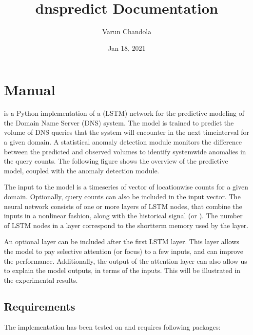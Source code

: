 \documentclass[letterpaper,10pt,english]{sphinxmanual}
\title{dnspredict Documentation}
\date{Jan 18, 2021}
\author{Varun Chandola}
\let\sphinxpxdimen\pdfpxdimen\else\newdimen\sphinxpxdimen
\begin{document}
\pagestyle{empty}
\sphinxmaketitle
\pagestyle{plain}
\sphinxtableofcontents
\pagestyle{normal}
\label{\detokenize{index::doc}}



\chapter{Manual}
\label{\detokenize{manual:manual}}\label{\detokenize{manual::doc}}
 is a Python implementation of a  (LSTM) network for the predictive modeling of the Domain Name Server (DNS) system. The model is trained to predict the volume of DNS queries that the system will encounter in the next time\sphinxhyphen{}interval for a given domain. A statistical anomaly detection module monitors the difference between the predicted and observed volumes to identify system\sphinxhyphen{}wide anomalies in the query counts. The following figure shows the overview of the predictive model, coupled with the anomaly detection module.

\noindent{\hspace*{\fill}\sphinxincludegraphics[width=600\sphinxpxdimen]{{overview}.png}\hspace*{\fill}}

The input to the model is a time\sphinxhyphen{}series of vector of location\sphinxhyphen{}wise counts for a given domain. Optionally,  query counts can also be included in the input vector. The neural network consists of one or more layers of LSTM nodes, that combine the inputs in a non\sphinxhyphen{}linear fashion, along with the historical signal (or ). The number of LSTM nodes in a layer correspond to the short\sphinxhyphen{}term memory used by the layer.

An optional  layer can be included after the first LSTM layer. This layer allows the model to pay selective attention (or focus) to a few inputs, and can improve the performance. Additionally, the output of the attention layer can also allow us to explain the model outputs, in terms of the inputs. This will be illustrated in the experimental results.


\section{Requirements}
\label{\detokenize{manual:requirements}}
The implementation has been tested on  and requires following packages:
\end{document}
